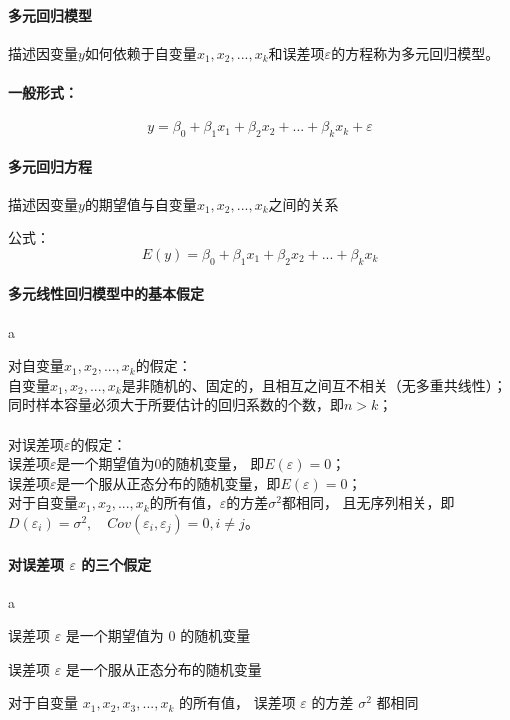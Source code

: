 \documentclass[UTF8,10pt]{book}
\begin{document}
\paragraph{多元回归模型}	描述因变量$y$如何依赖于自变量$x_1,x_2,...,x_k$和误差项$\varepsilon$的方程称为多元回归模型。 

\paragraph{一般形式：}$$y = \beta_0 + \beta_1 x_1 + \beta_2 x_2 + ... + \beta_k x_k + \varepsilon $$

\paragraph{多元回归方程}	描述因变量$y$的期望值与自变量$x_1,x_2,...,x_k$之间的关系 

公式：$$E(y) = \beta_0 + \beta_1 x_1 + \beta_2 x_2 + ... + \beta_k x_k$$

\paragraph{多元线性回归模型中的基本假定}	a

对自变量$x_1,x_2,...,x_k$的假定：\\
自变量$x_1,x_2,...,x_k$是非随机的、固定的，且相互之间互不相关（无多重共线性）；\\
同时样本容量必须大于所要估计的回归系数的个数，即$n>k$； 
\\
\\

对误差项$\varepsilon$的假定：
\\
误差项$\varepsilon$是一个期望值为$0$的随机变量，
即$E(\varepsilon)=0$；
\\
误差项$\varepsilon$是一个服从正态分布的随机变量，即$E(\varepsilon)=0$； 
\\
对于自变量$x_1,x_2,...,x_k$的所有值，$\varepsilon$的方差$\sigma^2$都相同，
且无序列相关，即
$D(\varepsilon_i) = \sigma^2 , \quad Cov(\varepsilon_i,\varepsilon_j)=0,i \neq j$。

\paragraph{对误差项 $\varepsilon$ 的三个假定}	a

误差项 $\varepsilon$ 是一个期望值为 $0$ 的随机变量

误差项 $\varepsilon$ 是一个服从正态分布的随机变量 

对于自变量 $ x_1, x_2 , x_3 , ... ,x_k$ 的所有值，
误差项 $\varepsilon$ 的方差 $ \sigma^2 $ 都相同
\end{document}
